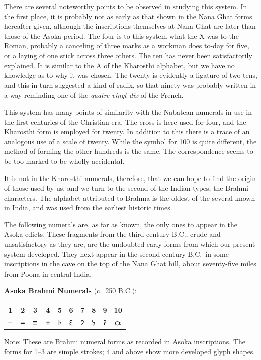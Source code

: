 \documentclass[11pt,a4paper]{article}
\newcommand{\dev}[1]{{\devanagarifont #1}}
\newenvironment{enhancednote}{%
  \begin{tcolorbox}[colback=enhancedbg,colframe=notecolor,boxrule=1pt,
    left=10pt,right=10pt,top=8pt,bottom=8pt,
    title={\textbf{Enhanced Edition Note}},fonttitle=\bfseries\color{notecolor}]
}{\end{tcolorbox}}
\begin{document}
There are several noteworthy points to be observed in studying this system. In the first place, it is probably not as early as that shown in the Nana Ghat forms hereafter given, although the inscriptions themselves at Nana Ghat are later than those of the Asoka period. The four is to this system what the X was to the Roman, probably a canceling of three marks as a workman does to-day for five, or a laying of one stick across three others. The ten has never been satisfactorily explained. It is similar to the A of the Kharosthi alphabet, but we have no knowledge as to why it was chosen. The twenty is evidently a ligature of two tens, and this in turn suggested a kind of radix, so that ninety was probably written in a way reminding one of the \textit{quatre-vingt-dix} of the French.

This system has many points of similarity with the Nabatean numerals in use in the first centuries of the Christian era. The cross is here used for four, and the Kharosthi form is employed for twenty. In addition to this there is a trace of an analogous use of a scale of twenty. While the symbol for 100 is quite different, the method of forming the other hundreds is the same. The correspondence seems to be too marked to be wholly accidental.

It is not in the Kharosthi numerals, therefore, that we can hope to find the origin of those used by us, and we turn to the second of the Indian types, the Brahmi characters. The alphabet attributed to Brahma is the oldest of the several known in India, and was used from the earliest historic times.

The following numerals are, as far as known, the only ones to appear in the Asoka edicts. These fragments from the third century B.C., crude and unsatisfactory as they are, are the undoubted early forms from which our present system developed. They next appear in the second century B.C.\ in some inscriptions in the cave on the top of the Nana Ghat hill, about seventy-five miles from Poona in central India.

\begin{enhancednote}
\textbf{Asoka Brahmi Numerals} (c.~250 B.C.):

\begin{center}
\begin{tabular}{|*{10}{c|}}
\hline
\textbf{1} & \textbf{2} & \textbf{3} & \textbf{4} & \textbf{5} & \textbf{6} & \textbf{7} & \textbf{8} & \textbf{9} & \textbf{10} \\
\hline
\dev{𑁒} & \dev{𑁓} & \dev{𑁔} & \dev{𑁕} & \dev{𑁖} & \dev{𑁗} & \dev{𑁘} & \dev{𑁙} & \dev{𑁚} & \dev{𑁛} \\
\hline
\end{tabular}
\end{center}

Note: These are Brahmi numeral forms as recorded in Asoka inscriptions. The forms for 1--3 are simple strokes; 4 and above show more developed glyph shapes.
\end{enhancednote}
\end{document}
